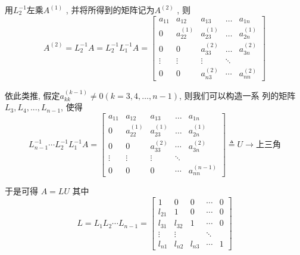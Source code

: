 \documentclass[12pt,a4paper]{article}
\begin{document}

用$L_{2}^{-1}$左乘$A^{(1)}$
, 并将所得到的矩阵记为$A^{(2)}$
, 则
$$
A^{(2)}=L_{2}^{-1} A=L_{2}^{-1} L_{1}^{-1}A=\left[\begin{array}{ccccc}{a_{11}} & {a_{12}} & {a_{13}} & {\dots} &{a_{1 n}} \\ {0} & {a_{22}^{(1)}} & {a_{23}^{(1)}} & {\dots} & {a_{2 n}^{(1)}} \\ {0} & {0} & {a_{33}^{(2)}} & {\dots} & {a_{3 n}^{(2)}} \\ {\vdots} & {\vdots} & {\vdots} & {\ddots} &{ } \\ {0} & {0} & {a_{n 3}^{(2)}} & {\cdots} & {a_{n n}^{(2)}}\end{array}\right]
$$

依此类推, 假定$a_{k k}^{(k-1)} \neq 0(k=3,4, \dots, n-1)$, 则我们可以构造一系
列的矩阵$ L_3, L_4, . . . , L_{n−1}$, 使得
$$
L_{n-1}^{-1} \cdots L_{2}^{-1} L_{1}^{-1} A=\left[\begin{array}{ccccc}{a_{11}} & {a_{12}} & {a_{13}} & {\dots} & {a_{1 n}} \\ {0} & {a_{22}^{(1)}} & {a_{23}^{(1)}} & {\dots} & {a_{2 n}^{(1)}} \\ {0} & {0} & {a_{33}^{(2)}} & {\cdots} & {a_{3 n}^{(2)}} \\ {\vdots} & {\vdots} & {\vdots} & {\ddots} \\ {0} & {0} & {0} & {\cdots} & {a_{n n}^{(n-1)}}\end{array}\right] \triangleq U \rightarrow \text{上三角}
$$

于是可得 $A = LU$ 其中
$$
L=L_{1} L_{2} \cdots L_{n-1}=\left[\begin{array}{ccccc}{1} & {0} & {0} & {\cdots} &{0}\\ {l_{21}} & {1} & {0} & {\cdots} &{0}\\ {l_{31}} & {l_{32}} & {1} & {\cdots} &{0}\\ {\vdots} & {\vdots} & { }& {\ddots} & { }\\ {l_{n 1}} & {l_{n 2}} & {l_{n 3}} & {\cdots} &{1}\end{array}\right]
$$
\end{document}
